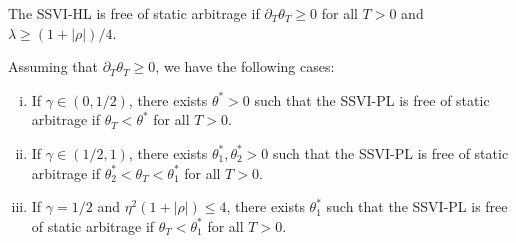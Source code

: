 \begin{proposition}\label{prop:heston}
The SSVI-HL is free of static arbitrage if $\partial_T \theta_T \ge 0$ for all $T>0$ and $\lambda \ge (1+|\rho|)/4$. 
\end{proposition}
\begin{proposition}\label{prop:power_law}
    Assuming that $\partial_T \theta_T \ge 0$, we have the following cases:
    \begin{enumerate}[(i)]
        \item If $\gamma \in (0,1/2)$, there exists $\theta^* >0$ such that the SSVI-PL is free of static arbitrage if $\theta_T < \theta^*$ for all $T>0$.
        \item If $\gamma \in (1/2,1)$, there exists $\theta_1^*,\theta_2^*>0$ such that the SSVI-PL is free of static arbitrage if $\theta_2^* < \theta_T < \theta_1^*$ for all $T>0$.
        \item If $\gamma = 1/2$ and $\eta^2(1+|\rho|)\le 4$, there exists $\theta_1^*$ such that the SSVI-PL is free of static arbitrage if $\theta_T < \theta_1^*$ for all $T>0$. 
    \end{enumerate}
\end{proposition}
